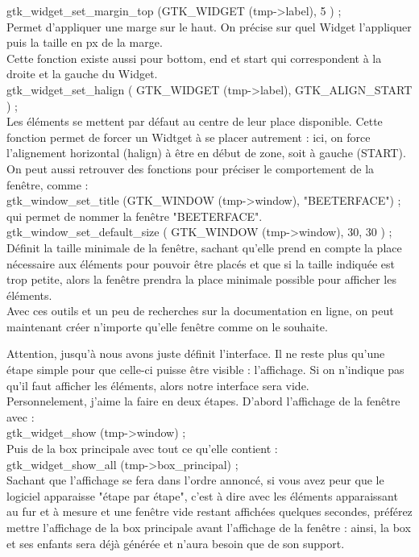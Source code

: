 \documentclass[11pt,french,a4paper]{report}
\begin{document}
 gtk\_widget\_set\_margin\_top (GTK\_WIDGET (tmp->label), 5 ) ; \\
Permet d'appliquer une marge sur le haut. On précise sur quel Widget l'appliquer puis la taille en px de la marge.\\
Cette fonction existe aussi pour bottom, end et start qui correspondent à la droite et la gauche du Widget.\\

 gtk\_widget\_set\_halign ( GTK\_WIDGET (tmp->label), GTK\_ALIGN\_START ) ;\\
Les éléments se mettent par défaut au centre de leur place disponible. Cette fonction permet 
de forcer un Widtget à se placer autrement : ici, on force l'alignement horizontal (halign) à être en début de zone, 
soit à gauche (START). \\

On peut aussi retrouver des fonctions pour préciser le comportement de la fenêtre, comme : \\
 gtk\_window\_set\_title (GTK\_WINDOW (tmp->window), "BEETERFACE") ; \\
qui permet de nommer la fenêtre "BEETERFACE". \\

 gtk\_window\_set\_default\_size ( GTK\_WINDOW (tmp->window), 30, 30 ) ; \\
Définit la taille minimale de la fenêtre, sachant qu'elle prend en compte la place nécessaire aux éléments pour pouvoir 
être placés et que si la taille indiquée est trop petite, alors la fenêtre prendra la place minimale possible 
pour afficher les éléments. \\

Avec ces outils et un peu de recherches sur la documentation en ligne, on peut maintenant créer n'importe qu'elle fenêtre 
comme on le souhaite. 

Attention, jusqu'à nous avons juste définit l'interface. Il ne reste plus qu'une étape simple pour que celle-ci puisse être 
visible : l'affichage. Si on n'indique pas qu'il faut afficher les éléments, alors notre interface sera vide. \\
Personnelement, j'aime la faire en deux étapes. D'abord l'affichage de la fenêtre avec : \\
gtk\_widget\_show (tmp->window) ; \\
Puis de la box principale avec tout ce qu'elle contient : \\
gtk\_widget\_show\_all (tmp->box\_principal) ; \\
Sachant que l'affichage se fera dans l'ordre annoncé, si vous avez peur que le logiciel apparaisse "étape par étape", c'est à 
dire avec les éléments apparaissant au fur et à mesure et une fenêtre vide restant affichées quelques secondes, préférez
mettre l'affichage de la box principale avant l'affichage de la fenêtre : ainsi, la box et ses enfants sera déjà générée 
et n'aura besoin que de son support. \\
\end{document}
